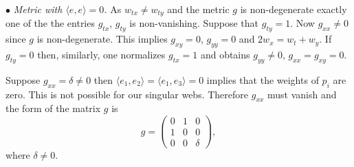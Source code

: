\documentclass[11pt]{article}
\begin{document}
$\bullet$ {\it Metric with $\langle e,e\rangle=0$.}
As $w_{tx}\ne w_{ty}$ and the metric $g$ is non-degenerate exactly one of the the entries $g_{tx}$, $g_{ty}$
is non-vanishing. Suppose that $g_{ty}=1$. Now $g_{xx}\ne 0$ since $g$ is non-degenerate.
This implies $g_{xy}=0$, $g_{yy}=0$ and $2w_x=w_t+w_y$.
If $g_{ty}=0$ then, similarly, one normalizes $g_{tx}=1$ and obtains $g_{yy}\ne 0$, $g_{xx}=g_{xy}=0$.

Suppose $g_{xx}=\delta\ne 0$ then $\langle e_1,e_2\rangle =\langle e_1,e_3\rangle =0$ implies that the weights of $p_i$ are zero. This is not possible for our singular webs. Therefore $g_{xx}$ must vanish and the form of the matrix $g$ is
\begin{equation}\label{metric0}
g=
\begin{pmatrix}
0 & 1 & 0\\
1 & 0 & 0\\
0 & 0 & \delta
\end{pmatrix},
\end{equation}
where $\delta \ne 0$.

\setcounter{section}{3}
\setcounter{subsection}{0}
\setcounter{subsubsection}{0}
\setcounter{equation}{3}
\setcounter{theorem}{1}
\end{document}

